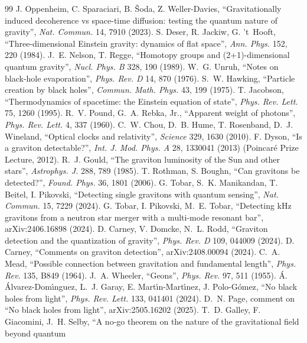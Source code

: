 \documentclass[11pt,a4paper]{article}
\theoremstyle{definition}
\theoremstyle{remark}
\begin{document}
\begin{thebibliography}{99}
 J. Oppenheim, C. Sparaciari, B. \v{S}oda, Z. Weller-Davies, ``Gravitationally induced decoherence vs space-time diffusion:
testing the quantum nature of gravity'', \emph{Nat. Commun.} 14, 7910 (2023).
 S. Deser, R. Jackiw, G. 't~Hooft, ``Three-dimensional Einstein gravity: dynamics of flat space'', \emph{Ann. Phys.} 152, 220
(1984).
 J.~E. Nelson, T. Regge, ``Homotopy groups and (2+1)-dimensional quantum gravity'', \emph{Nucl. Phys. B} 328, 190 (1989).
 W.~G. Unruh, ``Notes on black-hole evaporation'', \emph{Phys. Rev. D} 14, 870 (1976).
 S.~W. Hawking, ``Particle creation by black holes'', \emph{Commun. Math. Phys.} 43, 199 (1975).
 T. Jacobson, ``Thermodynamics of spacetime: the Einstein equation of state'', \emph{Phys. Rev. Lett.} 75, 1260 (1995).
 R.~V. Pound, G.~A. Rebka, Jr., ``Apparent weight of photons'', \emph{Phys. Rev. Lett.} 4, 337 (1960).
 C.~W. Chou, D.~B. Hume, T. Rosenband, D.~J. Wineland, ``Optical clocks and relativity'', \emph{Science} 329, 1630 (2010).
 F. Dyson, ``Is a graviton detectable?'', \emph{Int. J. Mod. Phys. A} 28, 1330041 (2013) (Poincar\'e Prize Lecture,
2012).
 R.~J. Gould, ``The graviton luminosity of the Sun and other stars'', \emph{Astrophys. J.} 288, 789 (1985).
 T. Rothman, S. Boughn, ``Can gravitons be detected?'', \emph{Found. Phys.} 36, 1801 (2006).
 G. Tobar, S.~K. Manikandan, T. Beitel, I. Pikovski, ``Detecting single gravitons with quantum sensing'', \emph{Nat.
Commun.} 15, 7229 (2024).
 G. Tobar, I. Pikovski, M.~E. Tobar, ``Detecting kHz gravitons from a neutron star merger with a multi-mode resonant
bar'', arXiv:2406.16898 (2024).
 D. Carney, V. Domcke, N.~L. Rodd, ``Graviton detection and the quantization of gravity'', \emph{Phys. Rev. D} 109, 044009
(2024).
 D. Carney, ``Comments on graviton detection'', arXiv:2408.00094 (2024).
 C.~A. Mead, ``Possible connection between gravitation and fundamental length'', \emph{Phys. Rev.} 135, B849 (1964).
 J.~A. Wheeler, ``Geons'', \emph{Phys. Rev.} 97, 511 (1955).
 \'A. \'Alvarez-Dom\'{\i}nguez, L.~J. Garay, E. Mart\'{\i}n-Mart\'{\i}nez, J. Polo-G\'omez, ``No black holes from
light'', \emph{Phys. Rev. Lett.} 133, 041401 (2024).
 D.~N. Page, comment on ``No black holes from light'', arXiv:2505.16202 (2025).
 T.~D. Galley, F. Giacomini, J.~H. Selby, ``A no-go theorem on the nature of the gravitational field beyond quantum

\end{thebibliography}
\end{document}
